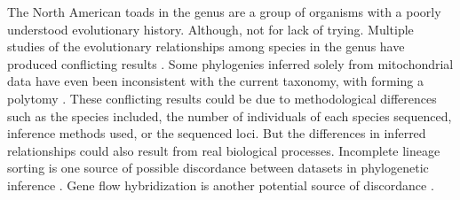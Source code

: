 The North American toads in the genus \anaxyrus are a group of organisms with a 
poorly understood evolutionary history. 
Although, not for lack of trying.
Multiple studies of the evolutionary relationships among species in the genus have produced
conflicting results \parencite{fontenot2011,graybeal1997,masta2002,pramuk2008,pyron2011,portik2023}.
Some phylogenies inferred solely from mitochondrial data have even been inconsistent
with the current taxonomy, with \fowleri forming a polytomy \parencite{fontenot2011,masta2002}.
These conflicting results could be due to methodological differences such as
the species included, the number of individuals of each species sequenced, inference 
methods used, or the sequenced loci. 
But the differences in inferred relationships could also result from real
biological processes. 
Incomplete lineage sorting is one source of possible discordance between datasets 
in phylogenetic inference \parencite{kubatko2007}. 
Gene flow hybridization is another potential source of discordance \parencite{degnan2009}. 





